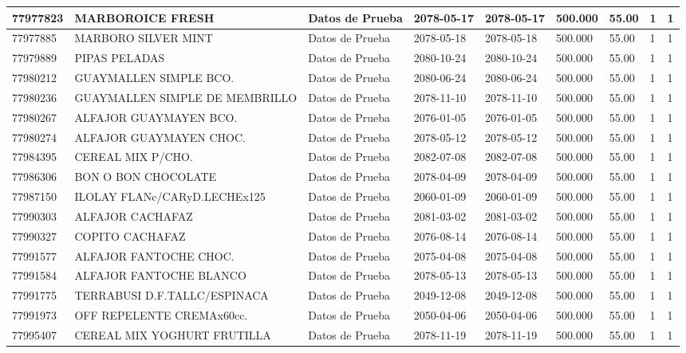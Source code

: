 \documentclass[a4paper,12pt]{article}
\begin{document}
\begin{landscape}
\begin{longtable}{|p{4cm}|p{2.5cm}|p{2.5cm}|p{1.8cm}|p{1.8cm}|p{1cm}|p{1cm}|p{3cm}|p{3cm}||}
77977823 & MARBOROICE FRESH & Datos de Prueba & 2078-05-17 & 2078-05-17 & 500.000 & 55.00 & 1 & 1 \\ \hline 
77977885 & MARBORO SILVER MINT & Datos de Prueba & 2078-05-18 & 2078-05-18 & 500.000 & 55.00 & 1 & 1 \\ \hline 
77979889 & PIPAS PELADAS & Datos de Prueba & 2080-10-24 & 2080-10-24 & 500.000 & 55.00 & 1 & 1 \\ \hline 
77980212 & GUAYMALLEN SIMPLE BCO. & Datos de Prueba & 2080-06-24 & 2080-06-24 & 500.000 & 55.00 & 1 & 1 \\ \hline 
77980236 & GUAYMALLEN SIMPLE DE MEMBRILLO & Datos de Prueba & 2078-11-10 & 2078-11-10 & 500.000 & 55.00 & 1 & 1 \\ \hline 
77980267 & ALFAJOR GUAYMAYEN BCO. & Datos de Prueba & 2076-01-05 & 2076-01-05 & 500.000 & 55.00 & 1 & 1 \\ \hline 
77980274 & ALFAJOR GUAYMAYEN CHOC. & Datos de Prueba & 2078-05-12 & 2078-05-12 & 500.000 & 55.00 & 1 & 1 \\ \hline 
77984395 & CEREAL MIX P/CHO. & Datos de Prueba & 2082-07-08 & 2082-07-08 & 500.000 & 55.00 & 1 & 1 \\ \hline 
77986306 & BON O BON CHOCOLATE & Datos de Prueba & 2078-04-09 & 2078-04-09 & 500.000 & 55.00 & 1 & 1 \\ \hline 
77987150 & ILOLAY FLANc/CARyD.LECHEx125 & Datos de Prueba & 2060-01-09 & 2060-01-09 & 500.000 & 55.00 & 1 & 1 \\ \hline 
77990303 & ALFAJOR CACHAFAZ & Datos de Prueba & 2081-03-02 & 2081-03-02 & 500.000 & 55.00 & 1 & 1 \\ \hline 
77990327 & COPITO CACHAFAZ & Datos de Prueba & 2076-08-14 & 2076-08-14 & 500.000 & 55.00 & 1 & 1 \\ \hline 
77991577 & ALFAJOR FANTOCHE CHOC. & Datos de Prueba & 2075-04-08 & 2075-04-08 & 500.000 & 55.00 & 1 & 1 \\ \hline 
77991584 & ALFAJOR FANTOCHE BLANCO & Datos de Prueba & 2078-05-13 & 2078-05-13 & 500.000 & 55.00 & 1 & 1 \\ \hline 
77991775 & TERRABUSI D.F.TALLC/ESPINACA & Datos de Prueba & 2049-12-08 & 2049-12-08 & 500.000 & 55.00 & 1 & 1 \\ \hline 
77991973 & OFF REPELENTE CREMAx60cc. & Datos de Prueba & 2050-04-06 & 2050-04-06 & 500.000 & 55.00 & 1 & 1 \\ \hline 
77995407 & CEREAL MIX YOGHURT FRUTILLA & Datos de Prueba & 2078-11-19 & 2078-11-19 & 500.000 & 55.00 & 1 & 1 \\ \hline 

\end{longtable}
\end{landscape}
\end{document}
